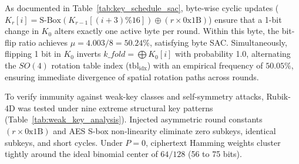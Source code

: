 \documentclass[10pt,twocolumn]{article}
\begin{document}
As documented in Table~\ref{tab:key_schedule_sac}, byte-wise cyclic updates ($K_r[i] = \text{S-Box}(K_{r-1}[(i+3)\%16]) \oplus (r \times \text{0x1B})$) ensure that a 1-bit change in $K_0$ alters exactly one active byte per round. Within this byte, the bit-flip ratio achieves $\mu = 4.003 / 8 = 50.24\%$, satisfying byte SAC. Simultaneously, flipping 1 bit in $K_0$ inverts $k\_fold = \bigoplus K_0[i]$ with probability 1.0, alternating the $SO(4)$ rotation table index ($\text{tbl}_{\text{idx}}$) with an empirical frequency of $50.05\%$, ensuring immediate divergence of spatial rotation paths across rounds.

\begin{table}[htbp]
\caption{Weak key and structural symmetry analysis under extreme master key patterns}
\label{tab:weak_key_analysis}
\centering
\small
{}
\end{table}

To verify immunity against weak-key classes and self-symmetry attacks, Rubik-4D was tested under nine extreme structural key patterns (Table~\ref{tab:weak_key_analysis}). Injected asymmetric round constants $(r \times \text{0x1B})$ and AES S-box non-linearity eliminate zero subkeys, identical subkeys, and short cycles. Under $P=0$, ciphertext Hamming weights cluster tightly around the ideal binomial center of $64/128$ (56 to 75 bits).
\end{document}
